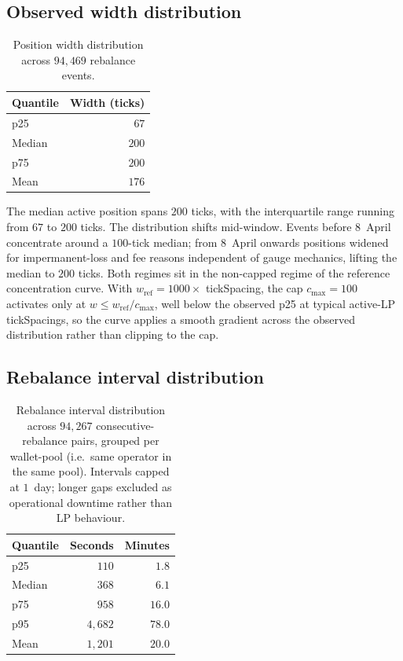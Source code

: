 \documentclass[11pt,a4paper]{article}
\theoremstyle{cgdefinition}
\theoremstyle{cgplain}
\theoremstyle{cgremark}
\begin{document}
\subsection{Observed width distribution}\label{sec:calwidth}

\begin{table}[H]
\centering
\begin{tabular}{@{}lr@{}}
\toprule
Quantile & Width (ticks) \\
\midrule
p25 & $67$ \\
Median & $200$ \\
p75 & $200$ \\
Mean & $176$ \\
\bottomrule
\end{tabular}
\caption{Position width distribution across $94{,}469$ rebalance events.}
\label{tab:width}
\end{table}

The median active position spans $200$ ticks, with the interquartile range running from $67$ to $200$ ticks. The distribution shifts mid-window. Events before 8~April concentrate around a $100$-tick median; from 8~April onwards positions widened for impermanent-loss and fee reasons independent of gauge mechanics, lifting the median to $200$ ticks. Both regimes sit in the non-capped regime of the reference concentration curve. With $w_{\text{ref}} = 1000 \times$ tickSpacing, the cap $c_{\max} = 100$ activates only at $w \leq w_{\text{ref}}/c_{\max}$, well below the observed p25 at typical active-LP tickSpacings, so the curve applies a smooth gradient across the observed distribution rather than clipping to the cap.

\subsection{Rebalance interval distribution}\label{sec:calinterval}

\begin{table}[H]
\centering
\begin{tabular}{@{}lrr@{}}
\toprule
Quantile & Seconds & Minutes \\
\midrule
p25 & $110$ & $1.8$ \\
Median & $368$ & $6.1$ \\
p75 & $958$ & $16.0$ \\
p95 & $4{,}682$ & $78.0$ \\
Mean & $1{,}201$ & $20.0$ \\
\bottomrule
\end{tabular}
\caption{Rebalance interval distribution across $94{,}267$ consecutive-rebalance pairs, grouped per wallet-pool (i.e.\ same operator in the same pool). Intervals capped at $1$~day; longer gaps excluded as operational downtime rather than LP behaviour.}
\label{tab:interval}
\end{table}
\end{document}

